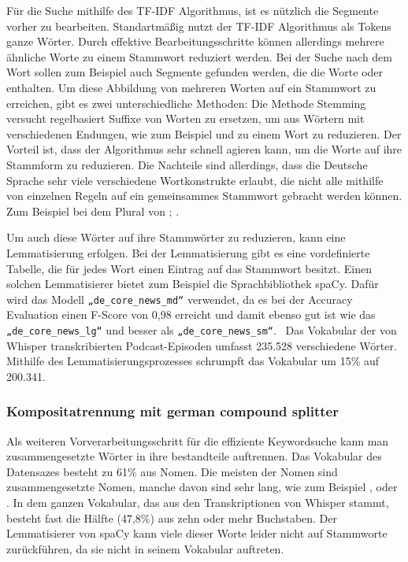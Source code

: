 Für die Suche mithilfe des TF-IDF Algorithmus, ist es nützlich die Segmente vorher zu bearbeiten.
Standartmäßig nutzt der TF-IDF Algorithmus als Tokens ganze Wörter.
Durch effektive Bearbeitungsschritte können allerdings mehrere ähnliche Worte zu einem Stammwort reduziert werden.
Bei der Suche nach dem Wort  sollen zum Beispiel auch Segmente gefunden werden, die die Worte  oder  enthalten.
Um diese Abbildung von mehreren Worten auf ein Stammwort zu erreichen, gibt es zwei unterschiedliche Methoden:
Die Methode Stemming versucht regelbasiert Suffixe von Worten zu ersetzen, um aus Wörtern mit verschiedenen Endungen, wie zum Beispiel  und  zu einem Wort  zu reduzieren.
Der Vorteil ist, dass der Algorithmus sehr schnell agieren kann, um die Worte auf ihre Stammform zu reduzieren.
Die Nachteile sind allerdings, dass die Deutsche Sprache sehr viele verschiedene Wortkonstrukte erlaubt, die nicht alle mithilfe von einzelnen Regeln auf ein gemeinsammes Stammwort gebracht werden können. 
Zum Beispiel bei dem Plural von ; .

Um auch diese Wörter auf ihre Stammwörter zu reduzieren, kann eine Lemmatisierung erfolgen. 
Bei der Lemmatisierung gibt es eine vordefinierte Tabelle, die für jedes Wort einen Eintrag auf das Stammwort besitzt. 
Einen solchen Lemmatisierer bietet zum Beispiel die Sprachbibliothek spaCy. 
Dafür wird das Modell \verb|„de_core_news_md“| verwendet, da es bei der Accuracy Evaluation einen F-Score von 0,98 erreicht und damit ebenso gut ist wie das \verb|„de_core_news_lg“| und besser als \verb|„de_core_news_sm“|.~\cite{spacy2024}
Das Vokabular der von Whisper transkribierten Podcast-Episoden umfasst 235.528 verschiedene Wörter.
Mithilfe des Lemmatisierungsprozesses schrumpft das Vokabular um 15\% auf 200.341.


\subsubsection{Kompositatrennung mit german compound splitter}

Als weiteren Vorverarbeitungsschritt für die effiziente Keywordsuche kann man zusammengesetzte Wörter in ihre bestandteile auftrennen.
Das Vokabular des Datensazes besteht zu 61\% aus Nomen. 
Die meisten der Nomen sind zusammengesetzte Nomen, manche davon sind sehr lang, wie zum Beispiel , oder .
In dem ganzen Vokabular, das aus den Transkriptionen von Whisper stammt, besteht fast die Hälfte (47,8\%) aus zehn oder mehr Buchstaben.
Der Lemmatisierer von spaCy kann viele dieser Worte leider nicht auf Stammworte zurückführen, da sie nicht in seinem Vokabular auftreten.

